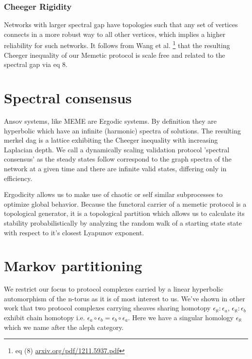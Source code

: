\documentclass{article}
\begin{document}
\subsubsection{Cheeger Rigidity}
Networks with larger spectral gap have topologies such that any set of vertices connects in a more robust way to all other vertices, which implies a higher reliability for such networks. It follows from Wang et al. \footnote{eq (8) \url{arxiv.org/pdf/1211.5937.pdf}} that the resulting Cheeger inequality of our Memetic protocol is scale free and related to the spectral gap via eq 8. 

\section{Spectral consensus}
Ansov systems, like MEME are Ergodic systems. By definition they are hyperbolic which have an infinite (harmonic) spectra of solutions. The resulting merkel dag 
is a lattice exhibiting the Cheeger inequality with increasing Laplacian depth. We call a dynamically scaling validation protocol 'spectral consensus' as the steady states follow correspond to the graph spectra of the network at a given time and there are infinite valid states, differing only in efficiency.

Ergodicity allows us to make use of chaotic or self similar subprocesses to optimize global behavior. Because the functoral carrier of a memetic protocol is a topological generator, it is a topological partition which allows us to calculate its stability probabilistically by analyzing the random walk of a starting state state with respect to it's closest Lyapunov exponent. 

\section{Markov partitioning}
We restrict our focus to protocol complexes carried by a linear hyperbolic automorphism of the n-torus as it is of most interest to us. We've shown in other work that two protocol complexes carrying sheaves sharing homotopy $\epsilon_{\aleph}: \epsilon_a$, $\epsilon_{\aleph}: \epsilon_b$ exhibit chain homotopy i.e. $\epsilon_a \circ \epsilon_b = \epsilon_b \circ \epsilon_a$. Here we have a singular homology $\epsilon_{\aleph}$ which we name after the aleph category. 
\end{document}
